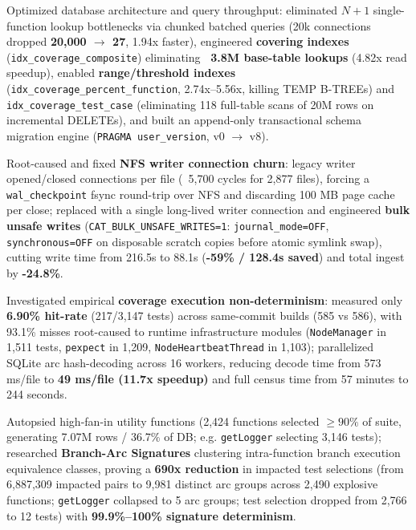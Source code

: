 {{        \item Optimized database architecture and query throughput: eliminated $N+1$ single-function lookup bottlenecks via chunked batched queries (20k connections dropped \textbf{20,000 $\to$ 27}, 1.94x faster), engineered \textbf{covering indexes} (\texttt{idx\_coverage\_composite}) eliminating \textbf{~3.8M base-table lookups} (4.82x read speedup), enabled \textbf{range/threshold indexes} (\texttt{idx\_coverage\_percent\_function}, 2.74x--5.56x, killing TEMP B-TREEs) and \texttt{idx\_coverage\_test\_case} (eliminating 118 full-table scans of 20M rows on incremental DELETEs), and built an append-only transactional schema migration engine (\texttt{PRAGMA user\_version}, v0 $\to$ v8).
        \item Root-caused and fixed \textbf{NFS writer connection churn}: legacy writer opened/closed connections per file (~5,700 cycles for 2,877 files), forcing a \texttt{wal\_checkpoint} fsync round-trip over NFS and discarding 100 MB page cache per close; replaced with a single long-lived writer connection and engineered \textbf{bulk unsafe writes} (\texttt{CAT\_BULK\_UNSAFE\_WRITES=1}: \texttt{journal\_mode=OFF}, \texttt{synchronous=OFF} on disposable scratch copies before atomic symlink swap), cutting write time from 216.5s to 88.1s (\textbf{-59\% / 128.4s saved}) and total ingest by \textbf{-24.8\%}.
        \item Investigated empirical \textbf{coverage execution non-determinism}: measured only \textbf{6.90\% hit-rate} (217/3,147 tests) across same-commit builds (585 vs 586), with 93.1\% misses root-caused to runtime infrastructure modules (\texttt{NodeManager} in 1,511 tests, \texttt{pexpect} in 1,209, \texttt{NodeHeartbeatThread} in 1,103); parallelized SQLite arc hash-decoding across 16 workers, reducing decode time from 573 ms/file to \textbf{49 ms/file (11.7x speedup)} and full census time from 57 minutes to 244 seconds.
        \item Autopsied high-fan-in utility functions (2,424 functions selected $\ge 90\%$ of suite, generating 7.07M rows / 36.7\% of DB; e.g. \texttt{getLogger} selecting 3,146 tests); researched \textbf{Branch-Arc Signatures} clustering intra-function branch execution equivalence classes, proving a \textbf{690x reduction} in impacted test selections (from 6,887,309 impacted pairs to 9,981 distinct arc groups across 2,490 explosive functions; \texttt{getLogger} collapsed to 5 arc groups; test selection dropped from 2,766 to 12 tests) with \textbf{99.9\%--100\% signature determinism}.
}}
